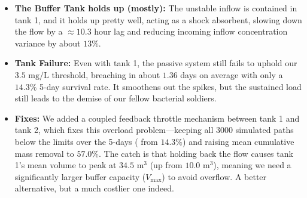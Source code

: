\documentclass[conference]{IEEEtran}
\theoremstyle{definitionsc}
\theoremstyle{plainsc}
\theoremstyle{remarksc}
\begin{document}
\begin{itemize}
	\item \textbf{The Buffer Tank holds up (mostly):} The unstable inflow is contained in tank 1, and it holds up pretty well, acting as a shock absorbent, slowing down the flow by a $\approx 10.3$ hour lag and reducing incoming inflow concentration variance by about $13\%$.
	\item \textbf{Tank Failure:} Even with tank 1, the passive system still fails to uphold our $3.5\text{ mg/L}$ threshold, breaching in about $1.36$ days on average with only a $14.3\%$ 5-day survival rate. It smoothens out the spikes, but the sustained load still leads to the demise of our fellow bacterial soldiers.
	\item \textbf{Fixes:} We added a coupled feedback throttle mechanism between tank 1 and tank 2, which fixes this overload problem—keeping all $3000$ simulated paths below the limits over the 5-days ( from $14.3\%$) and raising mean cumulative mass removal to $57.0\%$. The catch is that holding back the flow causes tank 1's mean volume to peak at $34.5\text{ m}^3$ (up from $10.0\text{ m}^3$), meaning we need a significantly larger buffer capacity ($V_{\max}$) to avoid overflow. A better alternative, but a much costlier one indeed.
\end{itemize}



\newpage
\end{document}
